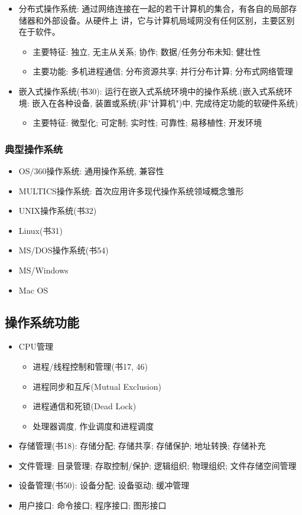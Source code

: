 \documentclass[a4paper, UTF8]{article}
\begin{document}
\begin{itemize}
\item 分布式操作系统: 通过网络连接在一起的若干计算机的集合，有各自的局部存储器和外部设备。从硬件上
讲，它与计算机局域网没有任何区别，主要区别在于软件。
	\begin{itemize}
	\item 主要特征: 独立, 无主从关系; 协作; 数据/任务分布未知; 健壮性
	\item 主要功能: 多机进程通信; 分布资源共享; 并行分布计算; 分布式网络管理
	\end{itemize}
\item 嵌入式操作系统(书30): 运行在嵌入式系统环境中的操作系统.(嵌入式系统环境: 嵌入在各种设备, 装置或系统(非"计算机")中, 完成待定功能的软硬件系统)
	\begin{itemize}
	\item 主要特征: 微型化; 可定制; 实时性; 可靠性; 易移植性; 开发环境
	\end{itemize}
\end{itemize}

\subsubsection{典型操作系统}
\begin{itemize}
\item OS/360操作系统: 通用操作系统, 兼容性
\item MULTICS操作系统: 首次应用许多现代操作系统领域概念雏形
\item UNIX操作系统(书32)
\item Linux(书31)
\item MS/DOS操作系统(书54)
\item MS/Windows
\item Mac OS
\end{itemize}

\subsection{操作系统功能}
\begin{itemize}
\item CPU管理
	\begin{itemize}
	\item 进程/线程控制和管理(书17, 46)
	\item 进程同步和互斥(Mutual Exclusion)
	\item 进程通信和死锁(Dead Lock)
	\item 处理器调度, 作业调度和进程调度
	\end{itemize}
\item 存储管理(书18): 存储分配; 存储共享; 存储保护; 地址转换; 存储补充
\item 文件管理: 目录管理; 存取控制/保护; 逻辑组织; 物理组织; 文件存储空间管理
\item 设备管理(书50): 设备分配; 设备驱动; 缓冲管理
\item 用户接口: 命令接口; 程序接口; 图形接口
\end{itemize}
\end{document}
